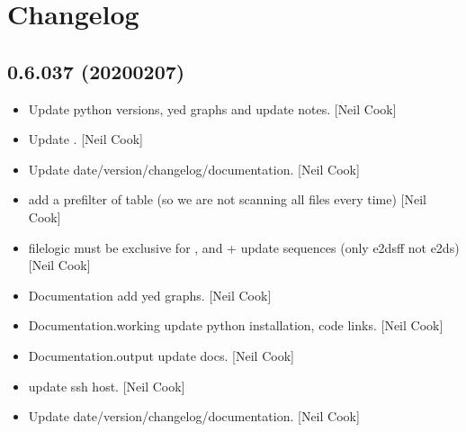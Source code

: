 \documentclass[a4paper,10pt,english]{report}
\begin{document}
\section{Changelog}
\label{\detokenize{misc/changelog:changelog}}\label{\detokenize{misc/changelog::doc}}

\subsection{0.6.037 (2020\sphinxhyphen{}02\sphinxhyphen{}07)}
\label{\detokenize{misc/changelog:id1}}\begin{itemize}
\item {} 
Update python versions, yed graphs and update notes. {[}Neil Cook{]}

\item {} 
Update . {[}Neil Cook{]}

\item {} 
Update date/version/changelog/documentation. {[}Neil Cook{]}

\item {} 
 \sphinxhyphen{} add a pre\sphinxhyphen{}filter of table (so we are not
scanning all files every time) {[}Neil Cook{]}

\item {} 
 \sphinxhyphen{} filelogic must be
exclusive for ,  and  + update sequences
(only e2dsff not e2ds) {[}Neil Cook{]}

\item {} 
Documentation \sphinxhyphen{} add yed graphs. {[}Neil Cook{]}

\item {} 
Documentation.working \sphinxhyphen{} update python installation, code links. {[}Neil
Cook{]}

\item {} 
Documentation.output \sphinxhyphen{} update docs. {[}Neil Cook{]}

\item {} 
 \sphinxhyphen{} update ssh host. {[}Neil Cook{]}

\item {} 
Update date/version/changelog/documentation. {[}Neil Cook{]}

\end{itemize}
\end{document}
